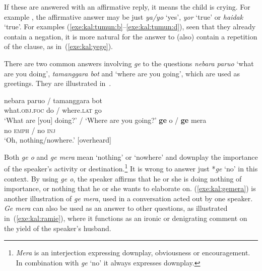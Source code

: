 \documentclass[output=paper,colorlinks,citecolor=brown,draft]{langscibook}
\begin{document}
If these are answered with an affirmative reply, it means the child is crying. For example , the affirmative answer may be just \textit{ya/yo} `yes', \textit{yor} `true' or \textit{haidak} `true'. For examples (\ref{exe:kal:tumun:b}--\ref{exe:kal:tumun:d}), seen that they already contain a negation, it is more natural for the answer to (also) contain a repetition of the clause, as in~(\ref{exe:kal:yege}).

\ea	\label{exe:kal:yege}
\begin{xlist}

\end{xlist}
\z 

There are two common answers involving \textit{ge} to the questions \textit{nebara paruo} `what are you doing', \textit{tamanggara bot} and `where are you going', which are used as greetings. They are illustrated in~.

\ea	\label{exe:kal:geo}
\begin{xlist}
{\gll nebara paruo / tamanggara bot\\
	what.\textsc{obj.foc} do / where.\textsc{lat} go\\ 
	\glt 	`What are [you] doing?' / `Where are you going?'
}
{\gll \textbf{ge} o / \textbf{ge} mera\\
	no \textsc{emph} / no \textsc{inj}\\
	\glt `Oh, nothing/nowhere.'  [overheard]}
\end{xlist}
\z

Both \textit{ge o} and \textit{ge mera} mean `nothing' or `nowhere' and downplay the importance of the speaker's activity or destination.\footnote{\textit{Mera} is an interjection expressing downplay, obviousness or encouragement. In combination with \textit{ge} `no' it always expresses downplay.} It is wrong to answer just *\textit{ge} `no' in this context. By using \textit{ge o}, the speaker affirms that he or she is doing nothing of importance, or nothing that he or she wants to elaborate on. (\ref{exe:kal:gemera}) is another illustration of \textit{ge mera}, used in a conversation acted out by one speaker. \textit{Ge mera} can also be used as an answer to other questions, as illustrated in~(\ref{exe:kal:ramie}), where it functions as an ironic or denigrating comment on the yield of the speaker's husband. 
\end{document}
